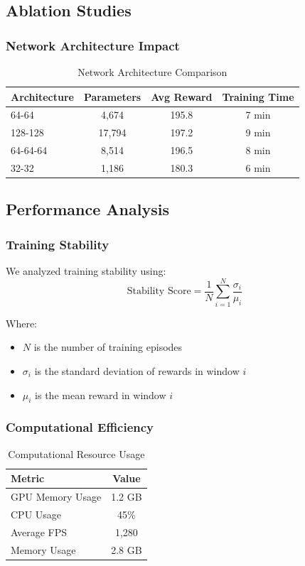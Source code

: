 \documentclass[conference]{IEEEtran}
\begin{document}
\subsection{Ablation Studies}
\subsubsection{Network Architecture Impact}
\begin{table}[h]
\caption{Network Architecture Comparison}
\begin{center}
\begin{tabular}{|l|c|c|c|}
\hline
\textbf{Architecture} & \textbf{Parameters} & \textbf{Avg Reward} & \textbf{Training Time} \\
\hline
64-64 & 4,674 & 195.8 & 7 min \\
128-128 & 17,794 & 197.2 & 9 min \\
64-64-64 & 8,514 & 196.5 & 8 min \\
32-32 & 1,186 & 180.3 & 6 min \\
\hline
\end{tabular}
\end{center}
\end{table}

\subsection{Performance Analysis}
\subsubsection{Training Stability}
We analyzed training stability using:
\begin{equation}
    \text{Stability Score} = \frac{1}{N}\sum_{i=1}^N \frac{\sigma_i}{\mu_i}
\end{equation}

Where:
\begin{itemize}
    \item $N$ is the number of training episodes
    \item $\sigma_i$ is the standard deviation of rewards in window $i$
    \item $\mu_i$ is the mean reward in window $i$
\end{itemize}

\subsubsection{Computational Efficiency}
\begin{table}[h]
\caption{Computational Resource Usage}
\begin{center}
\begin{tabular}{|l|c|}
\hline
\textbf{Metric} & \textbf{Value} \\
\hline
GPU Memory Usage & 1.2 GB \\
CPU Usage & 45\% \\
Average FPS & 1,280 \\
Memory Usage & 2.8 GB \\
\hline
\end{tabular}
\end{center}
\end{table}
\end{document}
